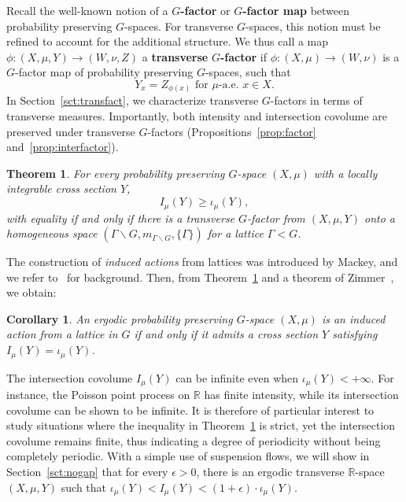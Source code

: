 \documentclass{amsart}
\numberwithin{equation}{subsection}
\newtheorem{cor}[thm]{Corollary}
\newtheorem{mainthm}{Theorem}
\theoremstyle{remark}
\begin{document}
\smallskip

Recall the well-known notion of a \(G\){\bf-factor} or \(G\){\bf-factor map} between probability preserving \(G\)-spaces. For transverse \(G\)-spaces, this notion must be refined to account for the additional structure. We thus call a map \(\phi:\left(X,\mu,Y\right)\to\left(W,\nu,Z\right)\) a {\bf transverse} \(G\){\bf-factor} if \(\phi:\left(X,\mu\right)\to\left(W,\nu\right)\) is a \(G\)-factor map of probability preserving \(G\)-spaces, such that
\[Y_{x}=Z_{\phi\left(x\right)}\text{ for }\mu\text{-a.e. }x\in X.\]
In Section~\ref{sct:transfact}, we characterize transverse \(G\)-factors in terms of transverse measures. Importantly, both intensity and intersection covolume are preserved under transverse \(G\)-factors (Propositions~\ref{prop:factor} and~\ref{prop:interfactor}).

\begin{mainthm}\label{thm:mthm}
For every probability preserving \(G\)-space \(\left(X,\mu\right)\) with a locally integrable cross section \(Y\),
\[I_{\mu}\left(Y\right)\geq\iota_{\mu}\left(Y\right),\]
with equality if and only if there is a transverse \(G\)-factor from \(\left(X,\mu,Y\right)\) onto a homogeneous space \(\left(\Gamma\backslash G,m_{\Gamma\backslash G},\{\Gamma\}\right)\) for a lattice \(\Gamma<G\).
\end{mainthm}

The construction of \emph{induced actions} from lattices was introduced by Mackey, and we refer to~\cite[\S II]{zimmer1978induced} for background. Then, from Theorem~\ref{thm:mthm} and a theorem of Zimmer~\cite[Theorem~2.5]{zimmer1978induced}, we obtain:

\begin{cor}
An ergodic probability preserving \(G\)-space \(\left(X,\mu\right)\) is an \emph{induced action} from a lattice in \(G\) if and only if it admits a cross section \(Y\) satisfying \(I_{\mu}\left(Y\right)=\iota_{\mu}\left(Y\right)\).
\end{cor}

The intersection covolume \(I_{\mu}\left(Y\right)\) can be infinite even when \(\iota_{\mu}\left(Y\right)<+\infty\). For instance, the Poisson point process on \(\mathbb{R}\) has finite intensity, while its intersection covolume can be shown to be infinite. It is therefore of particular interest to study situations where the inequality in Theorem~\ref{thm:mthm} is strict, yet the intersection covolume remains finite, thus indicating a degree of periodicity without being completely periodic. With a simple use of suspension flows, we will show in Section~\ref{sct:nogap} that for every \(\epsilon>0\), there is an ergodic transverse \(\mathbb{R}\)-space \(\left(X,\mu,Y\right)\) such that \(\iota_{\mu}\left(Y\right)<I_{\mu}\left(Y\right)<\left(1+\epsilon\right)\cdot\iota_{\mu}\left(Y\right)\).
\end{document}
